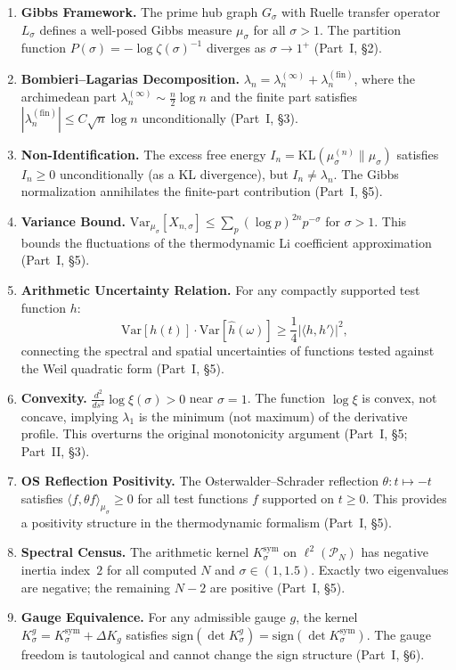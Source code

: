 \documentclass[12pt,a4paper]{article}
\theoremstyle{definition}
\theoremstyle{remark}
\newcommand{\Ksym}{K_\sigma^{\mathrm{sym}}}
\newcommand{\muG}{\mu_\sigma}
\newcommand{\PP}{\mathcal{P}}
\begin{document}
\begin{enumerate}[label=\textbf{R\arabic*},leftmargin=3em]
  \item \textbf{Gibbs Framework.} The prime hub graph $G_\sigma$ with Ruelle transfer operator $L_\sigma$ defines a well-posed Gibbs measure $\muG$ for all $\sigma > 1$. The partition function $P(\sigma) = -\log\zeta(\sigma)^{-1}$ diverges as $\sigma \to 1^+$ (Part~I, \S2).

  \item \textbf{Bombieri--Lagarias Decomposition.} $\lambda_n = \lambda_n^{(\infty)} + \lambda_n^{(\mathrm{fin})}$, where the archimedean part $\lambda_n^{(\infty)} \sim \frac{n}{2}\log n$ and the finite part satisfies $|\lambda_n^{(\mathrm{fin})}| \leq C\sqrt{n}\log n$ unconditionally (Part~I, \S3).

  \item \textbf{Non-Identification.} The excess free energy $I_n = \mathrm{KL}(\mu_\sigma^{(n)} \| \muG)$ satisfies $I_n \geq 0$ unconditionally (as a KL divergence), but $I_n \neq \lambda_n$. The Gibbs normalization annihilates the finite-part contribution (Part~I, \S5).

  \item \textbf{Variance Bound.} $\mathrm{Var}_{\muG}[X_{n,\sigma}] \leq \sum_p (\log p)^{2n}p^{-\sigma}$ for $\sigma > 1$. This bounds the fluctuations of the thermodynamic Li coefficient approximation (Part~I, \S5).

  \item \textbf{Arithmetic Uncertainty Relation.} For any compactly supported test function $h$:
  \[ \mathrm{Var}[h(t)] \cdot \mathrm{Var}[\hat{h}(\omega)] \geq \frac{1}{4}\bigl|\langle h, h' \rangle\bigr|^2, \]
  connecting the spectral and spatial uncertainties of functions tested against the Weil quadratic form (Part~I, \S5).

  \item \textbf{Convexity.} $\frac{d^2}{ds^2}\log\xi(\sigma) > 0$ near $\sigma = 1$. The function $\log\xi$ is convex, not concave, implying $\lambda_1$ is the minimum (not maximum) of the derivative profile. This overturns the original monotonicity argument (Part~I, \S5; Part~II, \S3).

  \item \textbf{OS Reflection Positivity.} The Osterwalder--Schrader reflection $\theta: t \mapsto -t$ satisfies $\langle f, \theta f \rangle_{\muG} \geq 0$ for all test functions $f$ supported on $t \geq 0$. This provides a positivity structure in the thermodynamic formalism (Part~I, \S5).

  \item \textbf{Spectral Census.} The arithmetic kernel $\Ksym$ on $\ell^2(\PP_N)$ has negative inertia index~$2$ for all computed $N$ and $\sigma \in (1, 1.5)$. Exactly two eigenvalues are negative; the remaining $N-2$ are positive (Part~I, \S5).

  \item \textbf{Gauge Equivalence.} For any admissible gauge $g$, the kernel $K_\sigma^g = \Ksym + \Delta K_g$ satisfies $\mathrm{sign}(\det K_\sigma^g) = \mathrm{sign}(\det \Ksym)$. The gauge freedom is tautological and cannot change the sign structure (Part~I, \S6).
\end{enumerate}
\end{document}
